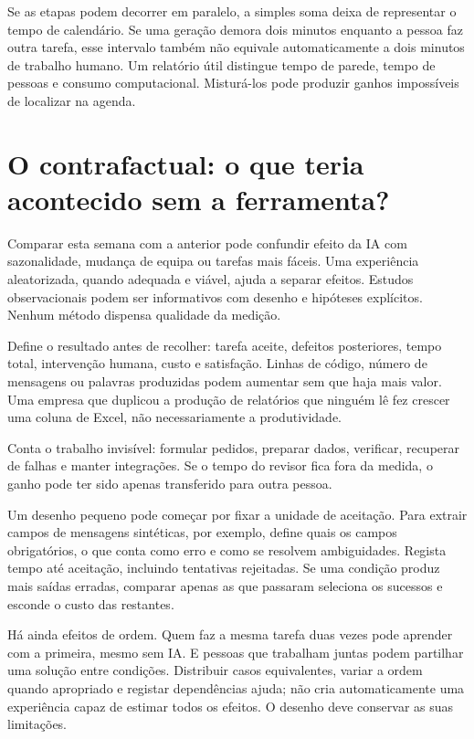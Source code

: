 Se as etapas podem decorrer em paralelo, a simples soma deixa de representar o tempo de calendário. Se uma geração demora dois minutos enquanto a pessoa faz outra tarefa, esse intervalo também não equivale automaticamente a dois minutos de trabalho humano. Um relatório útil distingue tempo de parede, tempo de pessoas e consumo computacional. Misturá-los pode produzir ganhos impossíveis de localizar na agenda.

\section{O contrafactual: o que teria acontecido sem a ferramenta?}
Comparar esta semana com a anterior pode confundir efeito da IA com sazonalidade, mudança de equipa ou tarefas mais fáceis. Uma experiência aleatorizada, quando adequada e viável, ajuda a separar efeitos. Estudos observacionais podem ser informativos com desenho e hipóteses explícitos. Nenhum método dispensa qualidade da medição.

Define o resultado antes de recolher: tarefa aceite, defeitos posteriores, tempo total, intervenção humana, custo e satisfação. Linhas de código, número de mensagens ou palavras produzidas podem aumentar sem que haja mais valor. Uma empresa que duplicou a produção de relatórios que ninguém lê fez crescer uma coluna de Excel, não necessariamente a produtividade.

Conta o trabalho invisível: formular pedidos, preparar dados, verificar, recuperar de falhas e manter integrações. Se o tempo do revisor fica fora da medida, o ganho pode ter sido apenas transferido para outra pessoa.

Um desenho pequeno pode começar por fixar a unidade de aceitação. Para extrair campos de mensagens sintéticas, por exemplo, define quais os campos obrigatórios, o que conta como erro e como se resolvem ambiguidades. Regista tempo até aceitação, incluindo tentativas rejeitadas. Se uma condição produz mais saídas erradas, comparar apenas as que passaram seleciona os sucessos e esconde o custo das restantes.

Há ainda efeitos de ordem. Quem faz a mesma tarefa duas vezes pode aprender com a primeira, mesmo sem IA. E pessoas que trabalham juntas podem partilhar uma solução entre condições. Distribuir casos equivalentes, variar a ordem quando apropriado e registar dependências ajuda; não cria automaticamente uma experiência capaz de estimar todos os efeitos. O desenho deve conservar as suas limitações.

